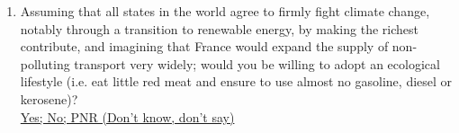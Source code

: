 \documentclass[english,5p,authoryear]{elsarticle}
\begin{document}
\begin{appendices}
\begin{enumerate}[resume,leftmargin=*]
{a sustainable way of life; I try, but I have trouble changing my habits} 
\item Assuming that all states in the world agree to firmly fight climate
change, notably through a transition to renewable energy, by making the richest contribute, and imagining that France would expand the
supply of non-polluting transport very widely; would you be willing
to adopt an ecological lifestyle (i.e. eat little red meat and ensure
to use almost no gasoline, diesel or kerosene)? \uline{}\\
\uline{Yes; No; PNR (Don't know, don't say) }
\end{enumerate}




\end{appendices}
\end{document}
